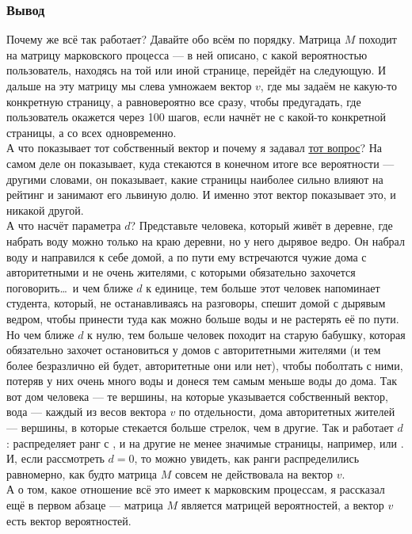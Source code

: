\documentclass[a3paper,14pt]{extarticle}
\newcommand*\circled[1]{\tikz[baseline=(char.base)]{
            \node[shape=circle,draw,inner sep=2pt] (char) {#1};}}
\begin{document}
\subsubsection*{\centering Вывод}
Почему же всё так работает? Давайте обо всём по порядку. Матрица $M$ походит на матрицу марковского процесса --- в ней описано, с какой вероятностью пользователь, находясь на той или иной странице, перейдёт на следующую. И дальше на эту матрицу мы слева умножаем вектор $v$, где мы задаём не какую-то конкретную страницу, а равновероятно все сразу, чтобы предугадать, где пользователь окажется через 100 шагов, если начнёт не с какой-то конкретной страницы, а со всех одновременно. \\ А что показывает тот собственный вектор и почему я задавал \hyperlink{eigenvec_question}{тот вопрос}? На самом деле он показывает, куда стекаются в конечном итоге все вероятности --- другими словами, он показывает, какие страницы наиболее сильно влияют на рейтинг и занимают его львиную долю. И именно этот вектор показывает это, и никакой другой.\\ А что насчёт параметра $d$? Представьте человека, который живёт в деревне, где набрать воду можно только на краю деревни, но у него дырявое ведро. Он набрал воду и направился к себе домой, а по пути ему встречаются чужие дома с авторитетными и не очень жителями, с которыми обязательно захочется поговорить\dots\  и чем ближе $d$ к единице, тем больше этот человек напоминает студента, который, не останавливаясь на разговоры, спешит домой с дырявым ведром, чтобы принести туда как можно больше воды и не растерять её по пути. Но чем ближе $d$ к нулю, тем больше человек походит на старую бабушку, которая обязательно захочет остановиться у домов с авторитетными жителями (и тем более безразлично ей будет, авторитетные они или нет), чтобы поболтать с ними, потеряв у них очень много воды и донеся тем самым меньше воды до дома. Так вот дом человека --- те вершины, на которые указывается собственный вектор, вода --- каждый из весов вектора $v$ по отдельности, дома авторитетных жителей --- вершины, в которые стекается больше стрелок, чем в другие. Так и работает $d$: распределяет ранг с \circled{4}, \circled{5} и \circled{10} на другие не менее значимые страницы, например, \circled{6} или \circled{12}. И, если рассмотреть $d = 0$, то можно увидеть, как ранги распределились равномерно, как будто матрица $M$ совсем не действовала на вектор $v$.\\
А о том, какое отношение всё это имеет к марковским процессам, я рассказал ещё в первом абзаце --- матрица $M$ является матрицей вероятностей, а вектор $v$ есть вектор вероятностей.
\end{document}

